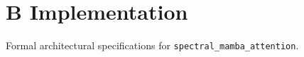 \section{B Implementation}

Formal architectural specifications for \texttt{spectral_mamba_attention}.
